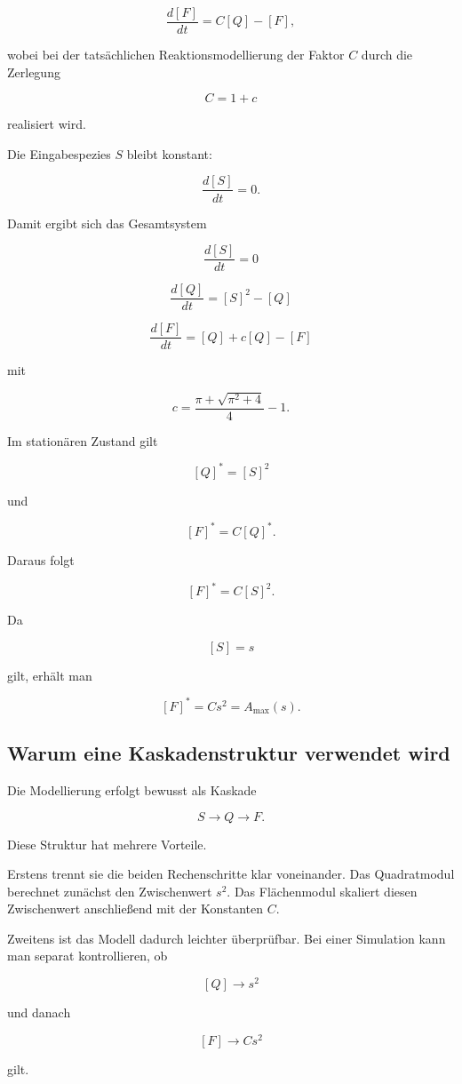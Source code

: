 \[
\frac{d[F]}{dt}
=
C[Q]-[F],
\]

wobei bei der tatsächlichen Reaktionsmodellierung der Faktor \(C\) durch
die Zerlegung

\[
C=1+c
\]

realisiert wird.

Die Eingabespezies \(S\) bleibt konstant:

\[
\frac{d[S]}{dt}=0.
\]

Damit ergibt sich das Gesamtsystem

\[
\boxed{
\frac{d[S]}{dt}=0
}
\]

\[
\boxed{
\frac{d[Q]}{dt}=[S]^2-[Q]
}
\]

\[
\boxed{
\frac{d[F]}{dt}=[Q]+c[Q]-[F]
}
\]

mit

\[
c
=
\frac{\pi+\sqrt{\pi^2+4}}{4}-1.
\]

Im stationären Zustand gilt

\[
[Q]^*=[S]^2
\]

und

\[
[F]^*=C[Q]^*.
\]

Daraus folgt

\[
[F]^*=C[S]^2.
\]

Da

\[
[S]=s
\]

gilt, erhält man

\[
[F]^*
=
C s^2
=
A_{\max}(s).
\]

\subsection{Warum eine Kaskadenstruktur verwendet wird}

Die Modellierung erfolgt bewusst als Kaskade

\[
S
\longrightarrow
Q
\longrightarrow
F.
\]

Diese Struktur hat mehrere Vorteile.

Erstens trennt sie die beiden Rechenschritte klar voneinander. Das
Quadratmodul berechnet zunächst den Zwischenwert \(s^2\). Das
Flächenmodul skaliert diesen Zwischenwert anschließend mit der Konstanten
\(C\).

Zweitens ist das Modell dadurch leichter überprüfbar. Bei einer Simulation
kann man separat kontrollieren, ob

\[
[Q]\longrightarrow s^2
\]

und danach

\[
[F]\longrightarrow C s^2
\]

gilt.

